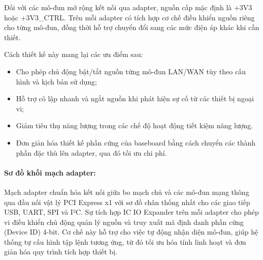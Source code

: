                     Đối với các mô-đun mở rộng kết nối qua adapter, nguồn cấp mặc định là +3V3 hoặc +3V3\_CTRL. Trên mỗi adapter có tích hợp cơ chế điều khiển nguồn riêng cho từng mô-đun, đồng thời hỗ trợ chuyển đổi sang các mức điện áp khác khi cần thiết.
                    
                    Cách thiết kế này mang lại các ưu điểm sau:
                    \begin{itemize}
                        \item Cho phép chủ động bật/tắt nguồn từng mô-đun LAN/WAN tùy theo cấu hình và kịch bản sử dụng;
                        \item Hỗ trợ cô lập nhanh và ngắt nguồn khi phát hiện sự cố từ các thiết bị ngoại vi;
                        \item Giảm tiêu thụ năng lượng trong các chế độ hoạt động tiết kiệm năng lượng.
                        \item Đơn giản hóa thiết kế phần cứng của baseboard bằng cách chuyển các thành phần đặc thù lên adapter, qua đó tối ưu chi phí.
                    \end{itemize}

                \paragraph{Sơ đồ khối mạch adapter:}

                    
                    Mạch adapter chuẩn hóa kết nối giữa bo mạch chủ và các mô-đun mạng thông qua đầu nối vật lý PCI Express x1 với sơ đồ chân thống nhất cho các giao tiếp USB, UART, SPI và I²C. Sự tích hợp IC IO Expander trên mỗi adapter cho phép vi điều khiển chủ động quản lý nguồn và truy xuất mã định danh phần cứng (Device ID) 4-bit. Cơ chế này hỗ trợ cho việc tự động nhận diện mô-đun, giúp hệ thống tự cấu hình tập lệnh tương ứng, từ đó tối ưu hóa tính linh hoạt và đơn giản hóa quy trình tích hợp thiết bị.

